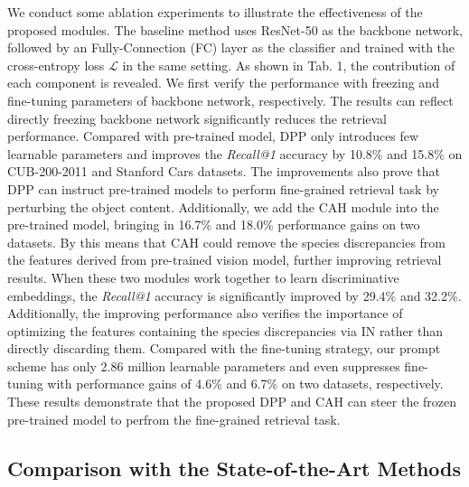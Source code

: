 \documentclass[letterpaper]{article} %
\begin{document}
We conduct some ablation experiments to illustrate the effectiveness of the proposed modules. The baseline method uses ResNet-50 as the backbone network, followed by an Fully-Connection (FC) layer as the classifier and trained with the cross-entropy loss $ \mathcal{L} $ in the same setting.
As shown in Tab. 1, the contribution of each component is revealed. We first verify the performance with freezing and fine-tuning parameters of backbone network, respectively. The results can reflect directly freezing backbone network significantly reduces the retrieval performance. Compared with pre-trained model, DPP only introduces few learnable parameters and improves the \textit{Recall@1} accuracy by 10.8\% and 15.8\% on CUB-200-2011 and Stanford Cars datasets. The improvements also prove that DPP can instruct pre-trained models to perform fine-grained retrieval task by perturbing the object content. Additionally, we add the CAH module into the pre-trained model, bringing in 16.7\% and 18.0\% performance gains on two datasets. By this means that CAH could remove the species discrepancies from the features derived from pre-trained vision model, further improving retrieval results. When these two modules work together to learn discriminative embeddings, the \textit{Recall@1} accuracy is significantly improved by 29.4\% and 32.2\%. Additionally, the improving performance also verifies the importance of optimizing the features containing the species discrepancies via IN rather than directly discarding them. Compared with the fine-tuning strategy, our prompt scheme has only 2.86 million learnable parameters and even suppresses fine-tuning with performance gains of 4.6\% and 6.7\% on two datasets, respectively.
These results demonstrate that the proposed DPP and CAH can steer the frozen pre-trained model to perfrom the fine-grained retrieval task.


\subsection{Comparison with the State-of-the-Art Methods}
\end{document}
